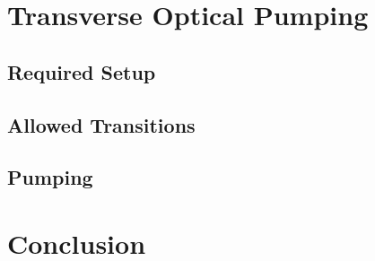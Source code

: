 \documentclass[letter,12pt]{article}
\begin{document}
\section{Transverse Optical Pumping}

	\subsection{Required Setup}

	\subsection{Allowed Transitions}

	\subsection{Pumping}

\section{Conclusion}



\end{document}
